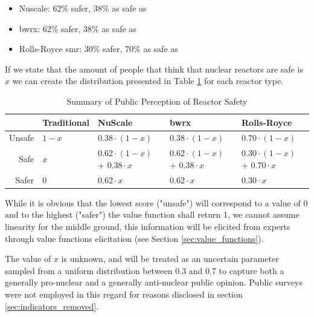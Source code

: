 \begin{itemize}
    \item Nuscale: 62\% safer, 38\% as safe as
    \item \gls{bwrx}: 62\% safer, 38\% as safe as
    \item Rolls-Royce \gls{smr}: 30\% safer, 70\% as safe as
\end{itemize}
If we state that the amount of people that think that nuclear reactors are safe is $x$ we can create the distribution presented in Table \ref{tab:safety_distribution} for each reactor type.
\begin{table}[h]
\centering
\caption{Summary of Public Perception of Reactor Safety}
\label{tab:safety_distribution}
\begin{tabularx}{\textwidth}{rXXXX}
\toprule
      & Traditional & NuScale & \gls{bwrx} & Rolls-Royce \\
\midrule
Unsafe & $1 - x$   & $0.38 \cdot (1 - x)$ & $0.38 \cdot (1 - x)$ & $0.70 \cdot (1 - x)$ \\
\midrule
Safe & $x$ & $0.62 \cdot (1 - x)$  + $0.38 \cdot x$ & $0.62 \cdot (1 - x)$ + $0.38 \cdot x$ & $0.30 \cdot (1-x)$ + $0.70 \cdot x$ \\
\midrule
Safer & 0 & $0.62 \cdot x$ & $0.62 \cdot x$ & $0.30 \cdot x$ \\
\bottomrule
\end{tabularx}
\end{table}
While it is obvious that the lowest score ("unsafe") will correspond to a value of 0 and to the highest ("safer") the value function shall return 1, we cannot assume linearity for the middle ground, this information will be elicited from experts through value functions elicitation (see Section \ref{sec:value_functions}).

The value of $x$ is unknown, and will be treated as an uncertain parameter sampled from a uniform distribution between 0.3 and 0.7 to capture both a generally pro-nuclear and a generally anti-nuclear public opinion. Public surveys were not employed in this regard for reasons disclosed in section \ref{sec:indicators_removed}.